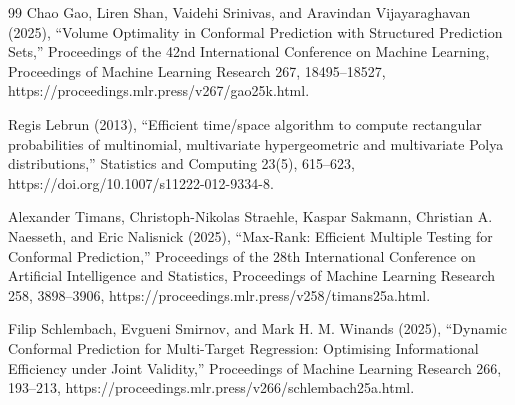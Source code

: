 \documentclass{article}
\begin{document}
\begin{thebibliography}{99}
   Chao Gao, Liren Shan, Vaidehi Srinivas, and Aravindan Vijayaraghavan (2025), ``Volume Optimality in Conformal Prediction with Structured Prediction Sets,'' Proceedings of the 42nd International Conference on Machine Learning, Proceedings of Machine Learning Research 267, 18495--18527, https://proceedings.mlr.press/v267/gao25k.html.

   Regis Lebrun (2013), ``Efficient time/space algorithm to compute rectangular probabilities of multinomial, multivariate hypergeometric and multivariate Polya distributions,'' Statistics and Computing 23(5), 615--623, https://doi.org/10.1007/s11222-012-9334-8.

   Alexander Timans, Christoph-Nikolas Straehle, Kaspar Sakmann, Christian A. Naesseth, and Eric Nalisnick (2025), ``Max-Rank: Efficient Multiple Testing for Conformal Prediction,'' Proceedings of the 28th International Conference on Artificial Intelligence and Statistics, Proceedings of Machine Learning Research 258, 3898--3906, https://proceedings.mlr.press/v258/timans25a.html.

   Filip Schlembach, Evgueni Smirnov, and Mark H. M. Winands (2025), ``Dynamic Conformal Prediction for Multi-Target Regression: Optimising Informational Efficiency under Joint Validity,'' Proceedings of Machine Learning Research 266, 193--213, https://proceedings.mlr.press/v266/schlembach25a.html.

\end{thebibliography}
\end{document}
